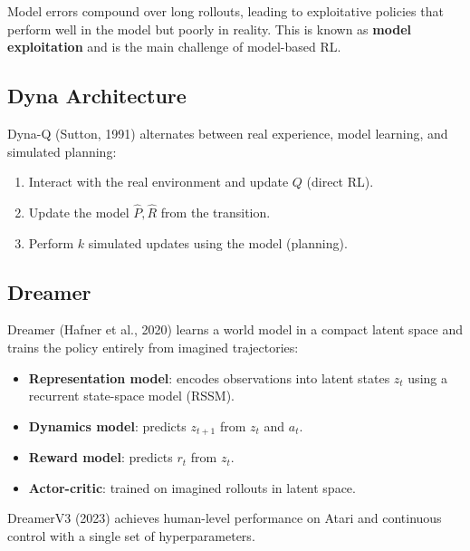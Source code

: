 \begin{attention}[title=\textbf{Model Bias}]
Model errors compound over long rollouts, leading to exploitative
policies that perform well in the model but poorly in reality. This
is known as \textbf{model exploitation} and is the main challenge of
model-based RL.
\end{attention}

\subsection{Dyna Architecture}

\begin{definition}[Dyna-Q]
Dyna-Q (Sutton, 1991) alternates between real experience, model learning,
and simulated planning:
\begin{enumerate}
    \item Interact with the real environment and update $Q$ (direct RL).
    \item Update the model $\hat{P}, \hat{R}$ from the transition.
    \item Perform $k$ simulated updates using the model (planning).
\end{enumerate}
\end{definition}

\subsection{Dreamer}

\begin{definition}[Dreamer]
Dreamer (Hafner et al., 2020) learns a world model in a compact latent
space and trains the policy entirely from imagined trajectories:
\begin{itemize}
    \item \textbf{Representation model}: encodes observations into latent
    states $z_t$ using a recurrent state-space model (RSSM).
    \item \textbf{Dynamics model}: predicts $z_{t+1}$ from $z_t$ and $a_t$.
    \item \textbf{Reward model}: predicts $r_t$ from $z_t$.
    \item \textbf{Actor-critic}: trained on imagined rollouts in latent space.
\end{itemize}
DreamerV3 (2023) achieves human-level performance on Atari and continuous
control with a single set of hyperparameters.
\end{definition}

